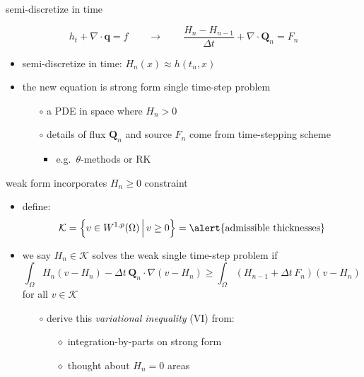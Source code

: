 \documentclass{beamer}
\newcommand\bq{\mathbf{q}}
\newcommand\bQ{\mathbf{Q}}
\newcommand\Div{\nabla\cdot}
\newcommand\grad{\nabla}
\begin{document}
\begin{frame}{semi-discretize in time}

$$h_t + \Div\bq = f \qquad \to \qquad \frac{H_n - H_{n-1}}{\Delta t} + \Div \bQ_n = F_n$$

  \begin{itemize}
  \item semi-discretize in time: $H_n(x) \approx h(t_n,x)$
  \item the new equation is strong form \alert{single time-step problem}
    \begin{itemize}
    \item[$\circ$] a PDE in space where $H_n>0$
    \item[$\circ$] details of flux $\bQ_n$ and source $F_n$ come from time-stepping scheme
      \begin{itemize}
      \item e.g.~$\theta$-methods or RK
      \end{itemize}
    \end{itemize}
  \end{itemize}
\end{frame}


\begin{frame}{weak form incorporates $H_n\ge 0$ constraint}

  \begin{itemize}
  \item define:
    $$\mathcal{K} = \left\{v \in W^{1,p}(\Omega) \,\Big|\, v\ge 0\right\} = \text{\alert{admissible thicknesses}}$$
  \item we say $H_n \in \mathcal{K}$ solves the \alert{weak single time-step problem} if
    $$\int_\Omega H_n (v - H_n) - \Delta t\, \bQ_n \cdot \grad(v - H_n) \ge \int_\Omega \left(H_{n-1} + \Delta t\, F_n\right) (v - H_n)$$
  for all $v \in \mathcal{K}$
  \small
  \medskip
    \begin{itemize}
    \item[$\circ$] derive this \emph{variational inequality} (VI) from:
      \begin{itemize}
      \item[$\diamond$] integration-by-parts on strong form
      \item[$\diamond$] thought about $H_n=0$ areas
      \end{itemize}
    \end{itemize}
  \end{itemize}
\end{frame}
\end{document}
